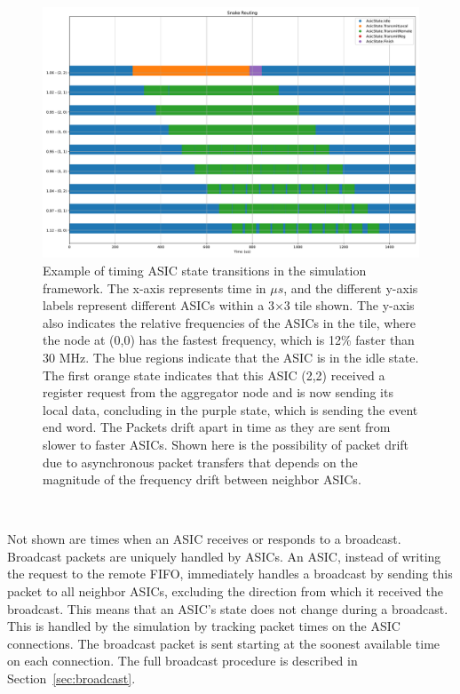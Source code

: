 \begin{figure}[]
\centering
\includegraphics[width=\textwidth]{images/snake_timer.pdf}
\caption{Example of timing ASIC state transitions in the simulation framework.
  The x-axis represents time in $\mu s$, and the different y-axis labels represent different ASICs within a 3$\times$3 tile shown.
  The y-axis also indicates the relative frequencies of the ASICs in the tile, where the node at (0,0) has the fastest frequency, which is 12\% faster than 30 MHz.
  The blue regions indicate that the ASIC is in the idle state.
  The first orange state indicates that this ASIC (2,2) received a register request from the aggregator node and is now sending its local data, concluding in the purple state, which is sending the event end word.
  The Packets drift apart in time as they are sent from slower to faster ASICs.
  Shown here is the possibility of packet drift due to asynchronous packet transfers that depends on the magnitude of the frequency drift between neighbor ASICs.
}
\end{figure}~\label{fig:snake_packet_drift}

Not shown are times when an ASIC receives or responds to a broadcast.
Broadcast packets are uniquely handled by ASICs.
An ASIC, instead of writing the request to the remote FIFO, immediately handles a broadcast by sending this packet to all neighbor ASICs, excluding the direction from which it received the broadcast.
This means that an ASIC's state does not change during a broadcast.
This is handled by the simulation by tracking packet times on the ASIC connections.
The broadcast packet is sent starting at the soonest available time on each connection.
The full broadcast procedure is described in Section~\ref{sec:broadcast}.


